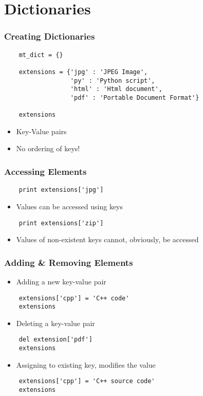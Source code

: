 \section{Dictionaries}

\begin{frame}[fragile]
  \frametitle{Creating Dictionaries}
  \begin{lstlisting}
    mt_dict = {}

    extensions = {'jpg' : 'JPEG Image', 
                  'py' : 'Python script', 
                  'html' : 'Html document', 
                  'pdf' : 'Portable Document Format'}

    extensions
  \end{lstlisting}
  \begin{itemize}
  \item Key-Value pairs
  \item \alert{ No ordering of keys! }
  \end{itemize}
\end{frame}

\begin{frame}[fragile]
  \frametitle{Accessing Elements}
  \begin{lstlisting}
    print extensions['jpg']
  \end{lstlisting}
  \begin{itemize}
  \item Values can be accessed using keys
  \end{itemize}
  \begin{lstlisting}
    print extensions['zip']
  \end{lstlisting}
  \begin{itemize}
  \item Values of non-existent keys cannot, obviously, be accessed
  \end{itemize}
\end{frame}

\begin{frame}[fragile]
  \frametitle{Adding \& Removing Elements}
  \begin{itemize}
  \item Adding a new key-value pair
  \end{itemize}
  \begin{lstlisting}
    extensions['cpp'] = 'C++ code'
    extensions
  \end{lstlisting}
  \begin{itemize}
  \item Deleting a key-value pair
  \end{itemize}
  \begin{lstlisting}
    del extension['pdf']
    extensions
  \end{lstlisting}
  \begin{itemize}
  \item Assigning to existing key, modifies the value
  \end{itemize}
  \begin{lstlisting}
    extensions['cpp'] = 'C++ source code'
    extensions
  \end{lstlisting}
\end{frame}


